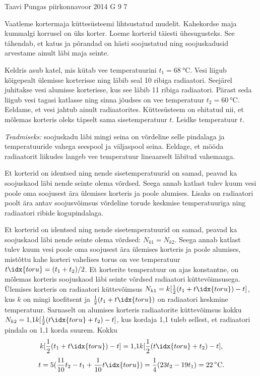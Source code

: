 {Taavi Pungas} %
{piirkonnavoor} %
{2014} %
{G 9} %
{7} %
{
\ifStatement
Vaatleme kortermaja küttesüsteemi lihtsustatud mudelit. Kahekordse maja kummalgi korrusel on üks korter. Loeme korterid täiesti ühesugusteks. See tähendab, et katus ja põrandad on hästi soojustatud ning soojuskadusid arvestame ainult läbi maja seinte. 

Keldris asub katel, mis kütab vee temperatuurini $t_1=\SI{68}{\celsius}$. Vesi liigub kõigepealt ülemisse korterisse ning läbib seal 10 ribiga radiaatori. Seejärel juhitakse vesi alumisse korterisse, kus see läbib 11 ribiga radiaatori. Pärast seda liigub vesi  tagasi katlasse ning sinna jõudses on vee temperatuur $t_2=\SI{60}{\celsius}$. Eeldame, et vesi jahtub ainult radiaatorites.  Küttesüsteem on ehitatud nii, et mõlemas korteris oleks täpselt sama sisetemperatuur $t$. Leidke temperatuur $t$. 

\emph{Teadmiseks:} soojuskadu läbi mingi seina on võrdeline selle pindalaga ja temperatuuride vahega seespool ja väljaspool seina. Eeldage, et mööda radiaatorit liikudes langeb vee temperatuur lineaarselt läbitud vahemaaga.
\fi


\ifHint
Et korterid on identsed ning nende sisetemperatuurid on samad, peavad ka soojuskaod läbi nende seinte olema võrdsed. Seega annab katlast tulev kuum vesi poole oma soojusest ära ülemises korteris ja poole alumises. Lisaks on radiaatori poolt ära antav soojusvõimsus võrdeline torude keskmise temperatuuriga ning radiaatori ribide kogupindalaga.
\fi


\ifSolution
Et korterid on identsed ning nende sisetemperatuurid on samad, peavad ka soojuskaod läbi nende seinte olema võrdsed: $N_{k1}=N_{k2}$. Seega annab katlast tulev kuum vesi poole oma soojusest ära ülemises korteris ja poole alumises, mistõttu kahe korteri vahelises torus on vee temperatuur $t\idx{toru}=(t_1+t_2)/2$. Et korterite temperatuur on ajas konstantne, on mõlemas korteris soojuskaod läbi seinte võrdsed radiaatori küttevõimsusega. Ülemises korteris on radiaatori küttevõimsus $N_{k1}=k[\frac{1}{2}(t_1+t\idx{toru})-t]$, kus $k$ on mingi koefitsent ja $\frac{1}{2}(t_1+t\idx{toru})$ on radiaatori keskmine temperatuur. Sarnaselt on alumises korteris radiaatorite küttevõimsus kokku $N_{k2}=\text{1,1} k[\frac{1}{2}(t\idx{toru}+t_{2})-t]$, kus kordaja 1,1 tuleb sellest, et radiaatori pindala on 1,1 korda suurem. Kokku
\[ k[\frac{1}{2}(t_1+t\idx{toru})-t]=\text{1,1}k[\frac{1}{2}(t\idx{toru}+t_{2})-t], \]
\[ t=5 (\frac{11}{10}t_2-t_1+\frac{1}{10}t\idx{toru})=\frac{1}{4}(23t_2-19t_1)=22\,^{\circ}\mathrm{C}. \]
\fi


}

